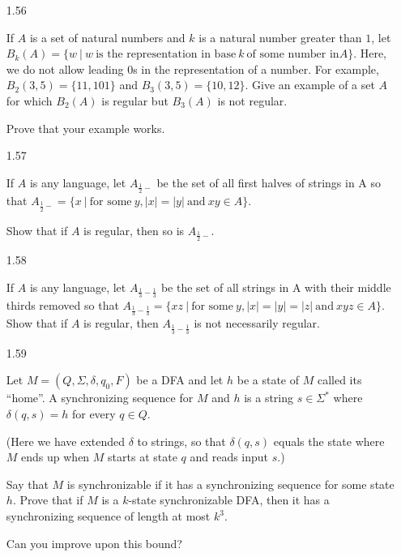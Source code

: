 \begin{enumerate}
      \item [1.56]
            
            If $A$ is a set of natural numbers and $k$ is a natural number greater than $1$, let $B_k(A)=\{w~|~w~ \text{is the representation in base}~k~\text{of some number in} A\}$. Here, we do not allow leading $0$s in the representation of a number. For example, $B_2({3,5})=\{11,101\}$ and $B_3({3,5})=\{10,12\}$. Give an example of a set $A$ for which $B_2(A)$ is regular but $B_3(A)$ is not regular. 
            
            Prove that your example works.
            
      \item [1.57]
            
            If $A$ is any language, let $A_{\frac{1}{2}-}$ be the set of all first halves of strings in A so that $A_{\frac{1}{2}-} = \{x~|~ \text{for some}~ y, |x| = |y| ~\text{and}~ xy \in A\}$. 
            
            Show that if $A$ is regular, then so is $A_{\frac{1}{2}-}$.
            
      \item [1.58]

      If $A$ is any language, let $A_{\frac{1}{3}-\frac{1}{3}}$ be the set of all strings in A with their middle thirds removed so that $A_{\frac{1}{3}-\frac{1}{3}} = \{xz~|~ \text{for some}~ y, |x| = |y| = |z|~ \text{and}~ xyz \in A\}$. Show that if $A$ is regular, then $A_{\frac{1}{3}-\frac{1}{3}}$ is not necessarily regular.

      \item [1.59]

      Let $M = (Q,\Sigma, \delta, q_0, F)$ be a DFA and let $h$ be a state of $M$ called its “home”. A synchronizing sequence for $M$ and $h$ is a string $s \in \Sigma^\ast$ where $\delta(q,s)=h$ for every $q \in Q$. 
      
      (Here we have extended $\delta$ to strings, so that $\delta(q,s)$ equals the state where $M$ ends up when $M$ starts at state $q$ and reads input $s$.) 
      
      Say that $M$ is synchronizable if it has a synchronizing sequence for some state $h$. Prove that if $M$ is a $k$-state synchronizable DFA, then it has a synchronizing sequence of length at most $k^3$. 
      
      Can you improve upon this bound?
            
\end{enumerate}
